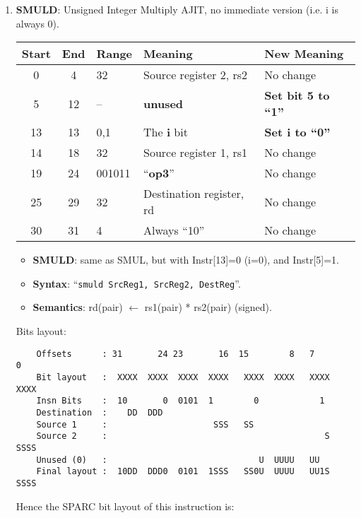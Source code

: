 \begin{enumerate}
\item \textbf{SMULD}: Unsigned Integer Multiply AJIT, no immediate
  version (i.e. i is always 0).\\
  \begin{center}
    \begin{tabular}[p]{|c|c|l|l|l|}
      \hline
      \textbf{Start} & \textbf{End} & \textbf{Range} & \textbf{Meaning} &
                                                                          \textbf{New Meaning}\\
      \hline
      0 & 4 & 32 & Source register 2, rs2 & No change \\
      5 & 12 & -- & \textbf{unused} & \textbf{Set bit 5 to ``1''} \\
      13 & 13 & 0,1 & The \textbf{i} bit & \textbf{Set i to ``0''} \\
      14 & 18 & 32 & Source register 1, rs1 & No change \\
      19 & 24 & 001011 & ``\textbf{op3}'' & No change \\
      25 & 29 & 32 & Destination register, rd & No change \\
      30 & 31 & 4 & Always ``10'' & No change \\
      \hline
    \end{tabular}
  \end{center}
  \begin{itemize}
  \item []\textbf{SMULD}: same as SMUL, but with Instr[13]=0 (i=0), and
    Instr[5]=1.
  \item []\textbf{Syntax}: ``\texttt{smuld  SrcReg1, SrcReg2, DestReg}''.
  \item []\textbf{Semantics}: rd(pair) $\leftarrow$ rs1(pair) *
    rs2(pair) (signed).
  \end{itemize}
  Bits layout:
\begin{verbatim}
    Offsets      : 31       24 23       16  15        8   7        0
    Bit layout   :  XXXX  XXXX  XXXX  XXXX   XXXX  XXXX   XXXX  XXXX
    Insn Bits    :  10       0  0101  1        0            1       
    Destination  :    DD  DDD                                       
    Source 1     :                     SSS   SS
    Source 2     :                                           S  SSSS
    Unused (0)   :                              U  UUUU   UU        
    Final layout :  10DD  DDD0  0101  1SSS   SS0U  UUUU   UU1S  SSSS
\end{verbatim}

  Hence the SPARC bit layout of this instruction is:


\end{enumerate}
